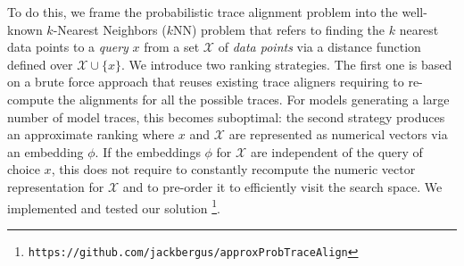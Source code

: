 To do this, we frame the probabilistic trace alignment problem into the well-known $k$-Nearest Neighbors ($k$NN) problem \cite{Altman} that refers to finding the $k$ nearest data points to a \textit{query} $x$ from a set $\mathcal{X}$ of \textit{data points} via a distance function defined over $\mathcal{X}\cup\{x\}$.
We introduce two ranking strategies. The first one is based on a brute force approach that reuses existing trace aligners  \cite{LeoniM17} %
requiring to re-compute
 the alignments %
 for all the possible traces. %
 For models generating a large number of model traces, this %
 becomes suboptimal: %
 the 
 second strategy %
  produces an approximate ranking where $x$ and $\mathcal{X}$ are represented as numerical vectors via an embedding $\phi$. 
If the embeddings $\phi$ for $\mathcal{X}$ are independent of the query of choice $x$, this does not require to constantly recompute the numeric vector representation for $\mathcal{X}$ and to pre-order it to efficiently visit the search space. We implemented and tested our solution
\footnote{{\small \texttt{\tiny https://github.com/jackbergus/approxProbTraceAlign}}}. 

